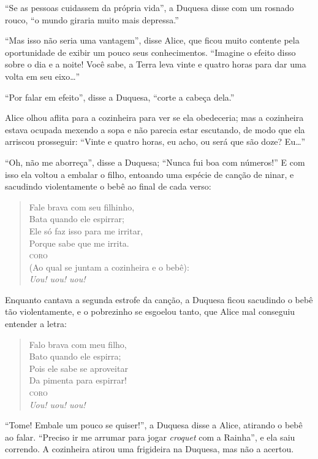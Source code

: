 ``Se as pessoas cuidassem da própria vida'', a Duquesa disse com um
rosnado rouco, ``o mundo giraria muito mais depressa.''

``Mas isso não seria uma vantagem'', disse Alice, que ficou muito
contente pela oportunidade de exibir um pouco seus conhecimentos.
``Imagine o efeito disso sobre o dia e a noite! Você sabe, a Terra leva
vinte e quatro horas para dar uma volta em seu eixo\ldots{}''

``Por falar em efeito'', disse a Duquesa, ``corte a cabeça dela.''

Alice olhou aflita para a cozinheira para ver se ela obedeceria; mas a
cozinheira estava ocupada mexendo a sopa e não parecia estar escutando,
de modo que ela arriscou prosseguir: ``Vinte e quatro horas, eu acho, ou
será que são doze? Eu\ldots{}''

``Oh, não me aborreça'', disse a Duquesa; ``Nunca fui boa com números!''
E com isso ela voltou a embalar o filho, entoando uma espécie de canção de
ninar, e sacudindo violentamente o bebê ao final de cada verso:

\begin{quote}
Fale brava com seu filhinho,\\
Bata quando ele espirrar;\\
Ele só faz isso para me irritar,\\
Porque sabe que me irrita.\\
\medskip
\noindent\textsc{coro}\\
(Ao qual se juntam a cozinheira e o bebê):\\
\textit{Uou! uou! uou!}
\end{quote}

Enquanto cantava a segunda estrofe da canção, a Duquesa ficou
sacudindo o bebê tão violentamente, e o pobrezinho se esgoelou tanto,
que Alice mal conseguiu entender a letra:

\begin{quote}
Falo brava com meu filho,\\
Bato quando ele espirra;\\
Pois ele sabe se aproveitar\\
Da pimenta para espirrar!\\
\medskip
\noindent\textsc{coro}\\
\textit{Uou! uou! uou!}
\end{quote}

``Tome! Embale um pouco se quiser!'', a Duquesa disse a Alice, atirando
o bebê ao falar. ``Preciso ir me arrumar para jogar \textit{croquet} com a
Rainha'', e ela saiu correndo. A cozinheira atirou uma frigideira na Duquesa,
mas não a acertou.

